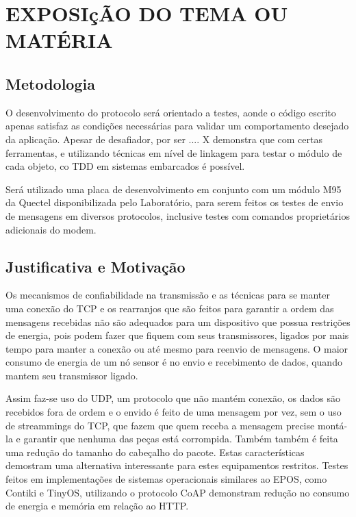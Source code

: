 

\section{EXPOSI\c{c}\~AO DO TEMA OU MAT\'ERIA}

\subsection{Metodologia}

O desenvolvimento do protocolo ser\'a orientado a testes, aonde o c\'odigo escrito apenas satisfaz as condi\c{c}\~oes necess\'arias para validar um comportamento desejado da aplica\c{c}\~ao.
Apesar de desafiador, por ser .... X demonstra que com certas ferramentas, e utilizando t\'ecnicas em n\'ivel de linkagem para testar o m\'odulo de cada objeto, co TDD em sistemas embarcados \'e poss\'ivel.

Ser\'a utilizado uma placa de desenvolvimento em conjunto com um m\'odulo M95 da Quectel disponibilizada pelo Laborat\'orio, para serem feitos os testes de envio de mensagens em diversos protocolos, inclusive testes com comandos propriet\'arios adicionais do modem.

\subsection{Justificativa e Motiva\c{c}\~ao}

Os mecanismos de confiabilidade na transmiss\~ao e as t\'ecnicas para se manter uma conex\~ao do TCP e os rearranjos que s\~ao feitos para garantir a ordem das mensagens recebidas n\~ao s\~ao adequados para um dispositivo que possua restri\c{c}\~oes de energia, pois podem fazer que fiquem com seus transmissores, ligados por mais tempo para manter a conex\~ao ou at\'e mesmo para reenvio de mensagens. O maior consumo de energia de um n\'o sensor \'e no envio e recebimento de dados, quando mantem seu transmissor ligado.

Assim faz-se uso do UDP, um protocolo que n\~ao mant\'em conex\~ao, os dados s\~ao recebidos fora de ordem e o envido \'e feito de uma mensagem por vez, sem o uso de streammings do TCP, que fazem que quem receba a mensagem precise mont\'a-la e garantir que nenhuma das pe\c{c}as est\'a corrompida. Tamb\'em tamb\'em \'e feita uma redu\c{c}\~ao do tamanho do cabe\c{c}alho do pacote. Estas caracter\'isticas demostram uma alternativa interessante para estes equipamentos restritos. Testes feitos em implementa\c{c}\~oes de sistemas operacionais similares ao EPOS, como Contiki e TinyOS, utilizando o protocolo CoAP demonstram redu\c{c}\~ao no consumo de energia e mem\'oria em rela\c{c}\~ao ao HTTP.

